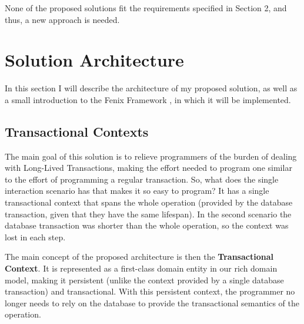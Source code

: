 \documentclass{llncs}
\begin{document}
None of the proposed solutions fit the requirements specified in
Section 2, and thus, a new approach is needed.

\section{Solution Architecture}
\label{sec:arch}

In this section I will describe the architecture of my proposed
solution, as well as a small introduction to the Fenix Framework
\cite{fernandes2011strict}, in which it will be implemented.

\subsection{Transactional Contexts}

The main goal of this solution is to relieve programmers of the burden
of dealing with Long-Lived Transactions, making the effort needed to
program one similar to the effort of programming a regular
transaction. So, what does the single interaction scenario has that
makes it so easy to program? It has a single transactional context
that spans the whole operation (provided by the database transaction,
given that they have the same lifespan). In the second scenario the
database transaction was shorter than the whole operation, so the
context was lost in each step.

The main concept of the proposed architecture is then the {\bf
  Transactional Context}. It is represented as a first-class domain
entity in our rich domain model, making it persistent (unlike the
context provided by a single database transaction) and
transactional. With this persistent context, the programmer no longer
needs to rely on the database to provide the transactional semantics
of the operation.
\end{document}
